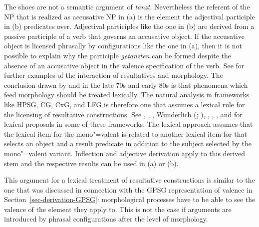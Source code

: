 \zl
The shoes are not a semantic argument of \emph{tanzt}. Nevertheless the referent of the NP that is realized as
accusative NP in (a) is the element the adjectival participle in (b) predicates
over. Adjectival participles like the one in (b) are derived from a passive participle of a
verb that governs an accusative object. If the accusative object is licensed phrasally by
configurations like the one in (a), then it is not possible to explain why the participle \emph{getanzten}
can be formed despite the absence of an accusative object in the valence specification of the verb. See  for
further examples of the interaction of resultatives and morphology.
The conclusion drawn by \citet[]{Dowty78a}
and \citet[]{Bresnan82a} in the late 70s and early 80s is that phenomena which feed morphology should be treated
lexically. The natural analysis in frameworks like HPSG, CG, CxG, and LFG is therefore one that assumes
a lexical rule for the licensing of resultative constructions. See
, , , Wunderlich (\citeyear[]{Wunderlich92a-u-kopiert}; \citeyear[--126]{Wunderlich97c}), ,
 , , and  for lexical proposals in some of
 these frameworks. The lexical approach assumes that the lexical item for the mono"=valent  is related to
 another lexical item for  that selects an object and a result predicate in addition to
 the subject selected by the mono"=valent variant. Inflection and adjective derivation apply to this
 derived stem and the respective results can be used in (a) or (b).

This argument for a lexical treatment of resultative constructions is similar to the one that was discussed in connection with the GPSG representation of
valence in Section~\ref{sec-derivation-GPSG}: morphological processes have to be able to see the valence of the element
they apply to. This is not the case if arguments are introduced by phrasal configurations after the
level of morphology.

